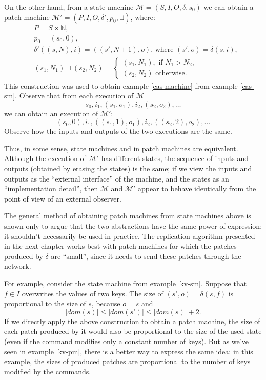 \documentclass[12pt,a4paper,en]{pracamgr}
\newcommand{\mc}[1]{\mathcal{#1}}
\newcommand{\mbb}[1]{\mathbb{#1}}
\begin{document}
On the other hand, from a state machine $\mc M = (S, I, O, \delta, s_0)$ we can obtain a patch machine $\mc M' = (P, I, O, \delta', p_0, \sqcup)$, where:
\begin{align*}
    & P = S \times \mbb N,\\
    & p_0 = (s_0, 0),\\
    & \delta'((s, N), i) = ((s', N+1), o)\text{, where } (s', o) = \delta(s, i),\\
    & (s_1, N_1) \sqcup (s_2, N_2) = \begin{cases} (s_1, N_1), \text{ if } N_1 > N_2,\\ (s_2, N_2) \text{ otherwise. } \end{cases}
\end{align*}
This construction was used to obtain example \ref{cas-machine} from example \ref{cas-sm}. Observe that from each execution of $\mc M$
$$ s_0, i_1, (s_1, o_1), i_2, (s_2, o_2), \dots $$
we can obtain an execution of $\mc M'$:
$$ (s_0, 0), i_1, ((s_1, 1), o_1), i_2, ((s_2, 2), o_2), \dots $$
Observe how the inputs and outputs of the two executions are the same.

Thus, in some sense, state machines and in patch machines are equivalent. Although the execution of $\mc M'$ has different states, the sequence of inputs and outputs (obtained by erasing the states) is the same; if we view the inputs and outputs as the ``external interface'' of the machine, and the states as an ``implementation detail'', then $\mc M$ and $\mc M'$ appear to behave identically from the point of view of an external observer.

The general method of obtaining patch machines from state machines above is shown only to argue that the two abstractions have the same power of expression; it shouldn't necessarily be used in practice. The replication algorithm presented in the next chapter works best with patch machines for which the patches produced by $\delta$ are ``small'', since it needs to send these patches through the network.

For example, consider the state machine from example \ref{kv-sm}. Suppose that $f \in I$ overwrites the values of two keys. The size of $(s', o) = \delta(s, f)$ is proportional to the size of $s$, because $o = s$ and
$$ |dom(s)| \le |dom(s')| \le |dom(s)| + 2. $$
If we directly apply the above construction to obtain a patch machine, the size of each patch produced by it would also be proportional to the size of the used state (even if the command modifies only a constant number of keys). But as we've seen in example \ref{kv-pm}, there is a better way to express the same idea: in this example, the sizes of produced patches are proportional to the number of keys modified by the commands.
\end{document}
